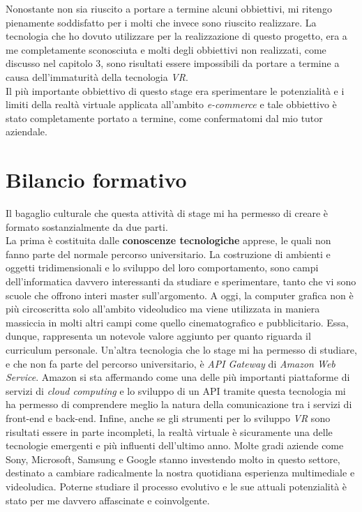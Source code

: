 Nonostante non sia riuscito a portare a termine alcuni obbiettivi, mi ritengo pienamente soddisfatto per i molti che invece sono riuscito realizzare. La tecnologia che ho dovuto utilizzare per la realizzazione di questo progetto, era a me completamente sconosciuta e molti degli obbiettivi non realizzati, come discusso nel capitolo 3, sono risultati essere impossibili da portare a termine a causa dell'immaturità della tecnologia \textit{VR}. \\ 
Il più importante obbiettivo di questo stage era sperimentare le potenzialità e i limiti della realtà virtuale applicata all'ambito \textit{e-commerce} e tale obbiettivo è stato completamente portato a termine, come confermatomi dal mio tutor aziendale.

\section{Bilancio formativo}

Il bagaglio culturale che questa attività di stage mi ha permesso di creare è formato sostanzialmente da due parti. \\
La prima è costituita dalle \textbf{conoscenze tecnologiche} apprese, le quali non fanno parte del normale percorso universitario. La costruzione di ambienti e oggetti tridimensionali e lo sviluppo del loro comportamento, sono campi dell'informatica davvero interessanti da studiare e sperimentare, tanto che vi sono scuole che offrono interi master sull'argomento. A oggi, la computer grafica non è più circoscritta solo all'ambito videoludico ma viene utilizzata in maniera massiccia in molti altri campi come quello cinematografico e pubblicitario. Essa, dunque, rappresenta un notevole valore aggiunto per quanto riguarda il curriculum personale. Un'altra tecnologia che lo stage mi ha permesso di studiare, e che non fa parte del percorso universitario, è \textit{API Gateway} di \textit{Amazon Web Service}. Amazon si sta affermando come una delle più importanti piattaforme di servizi di \textit{cloud computing}\hyperlink{cc}{} e lo sviluppo di un API tramite questa tecnologia mi ha permesso di comprendere meglio la natura della comunicazione tra i servizi di front-end e back-end. Infine, anche se gli strumenti per lo sviluppo \textit{VR} sono risultati essere in parte incompleti, la realtà virtuale è sicuramente una delle tecnologie emergenti e più influenti dell'ultimo anno. Molte gradi aziende come Sony, Microsoft, Samsung e Google stanno investendo molto in questo settore, destinato a cambiare radicalmente la nostra quotidiana esperienza multimediale e videoludica. Poterne studiare il processo evolutivo e le sue attuali potenzialità è stato per me davvero affascinate e coinvolgente.


